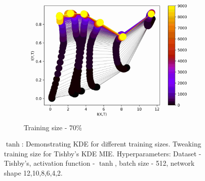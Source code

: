 \documentclass[dissertation.tex]{subfiles}
\begin{document}
\begin{figure}[ht]
\begin{subfigure}[t]{0.32\textwidth}
    \includegraphics[width=\textwidth]{figs/eval/trainingSize/KDE70.jpg}
    \caption{
      Training size - 70\%
    }
  \end{subfigure}
  \caption{
      $\tanh$: Demonstrating KDE for different training sizes.  Tweaking training
      size for Tishby's KDE MIE. Hyperparameters: Dataset - Tishby's, activation
      function - $\tanh$, batch size - 512, network shape 12,10,8,6,4,2.
    }
  \label{figKDETSA}
\end{figure}
\end{document}
